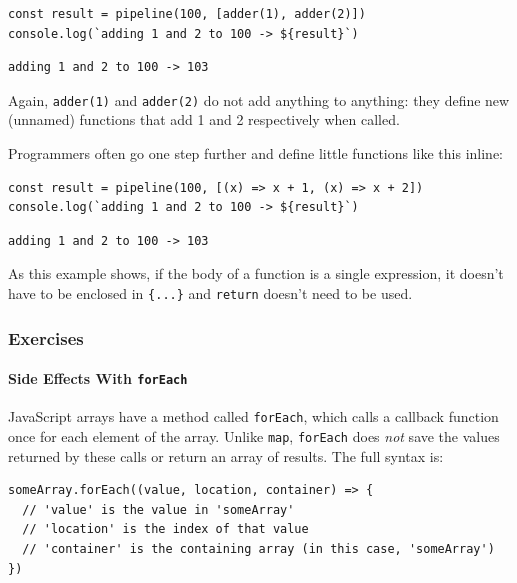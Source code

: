 \begin{verbatim}
const result = pipeline(100, [adder(1), adder(2)])
console.log(`adding 1 and 2 to 100 -> ${result}`)
\end{verbatim}

\begin{verbatim}
adding 1 and 2 to 100 -> 103
\end{verbatim}

Again, \texttt{adder(1)} and \texttt{adder(2)} do not add anything to
anything: they define new (unnamed) functions that add 1 and 2
respectively when called.

Programmers often go one step further and define little functions like
this inline:

\begin{verbatim}
const result = pipeline(100, [(x) => x + 1, (x) => x + 2])
console.log(`adding 1 and 2 to 100 -> ${result}`)
\end{verbatim}

\begin{verbatim}
adding 1 and 2 to 100 -> 103
\end{verbatim}

As this example shows, if the body of a function is a single expression,
it doesn't have to be enclosed in \texttt{\{...\}} and \texttt{return}
doesn't need to be used.

\subsubsection{Exercises}\label{s:callbacks-exercises}

\paragraph{\texorpdfstring{Side Effects With
\texttt{forEach}}{Side Effects With forEach}}\label{side-effects-with-foreach}

JavaScript arrays have a method called \texttt{forEach}, which calls a
callback function once for each element of the array. Unlike
\texttt{map}, \texttt{forEach} does \emph{not} save the values returned
by these calls or return an array of results. The full syntax is:

\begin{verbatim}
someArray.forEach((value, location, container) => {
  // 'value' is the value in 'someArray'
  // 'location' is the index of that value
  // 'container' is the containing array (in this case, 'someArray')
})
\end{verbatim}

